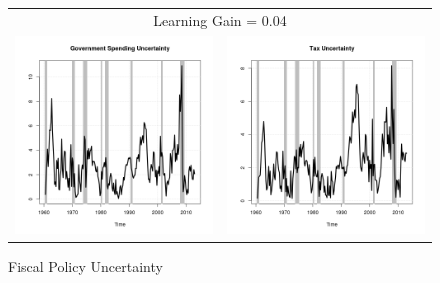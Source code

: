 \documentclass[11pt]{article}
\begin{document}
\begin{figure}\caption{Fiscal Policy Uncertainty}\label{fg:fpu0.04}
\begin{center}
\begin{tabular}{cc}
\multicolumn{2}{c}{Learning Gain = 0.04} \\ [0.5pc]
\includegraphics[scale=0.45]{./results/pics0.04/fpu_gov.png} & \includegraphics[scale=0.45]{./results/pics0.04/fpu_tax.png} \\

\end{tabular}
\end{center}
\end{figure}
\end{document}
